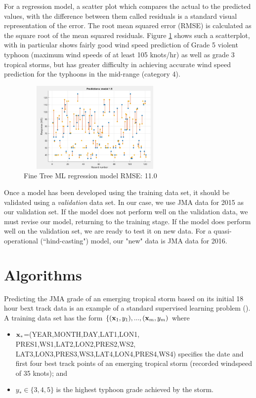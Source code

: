 \documentclass{SBCbookchapter}
\begin{document}
  
For a regression model, a scatter plot which compares the actual to the predicted values, with the difference between them called residuals is a standard visual representation of the error. The root mean squared error (RMSE) is calculated as the square root of the mean squared residuals. Figure \ref{FineTreeRegression} shows such a scatterplot, with in particular shows fairly good wind speed prediction of Grade 5 violent typhoon (maximum wind speeds of at least 105 knots/hr) as well as grade 3 tropical storms, but has greater difficulty in achieving accurate wind speed prediction for the typhoons in the mid-range (category 4).

\begin{figure}[!htpb]
	\centering
	\includegraphics[width=3in,height=1.75in]{TyphoonCM2.png}
	\caption{Fine Tree ML regression model RMSE: 11.0 }
	\label{FineTreeRegression}
\end{figure}



Once a model has been developed using the training data set, it should be validated using a \emph{validation} data set. In our case, we use JMA data for 2015  as our validation set.  If the model does not perform well on the validation data, we must revise our model, returning to the training stage.  If the model does perform well on the validation set, we are ready to test it on new data. For a quasi-operational (``hind-casting") model, our "new" data is JMA data for 2016.

\section{Algorithms}

Predicting the JMA grade of an emerging tropical storm based on its initial 18 hour bext track data is an example of a standard supervised learning problem (\cite{Diet}). A training data set has the form $\{({\bf x}_1,y_1),...,({\bf x}_m,y_m)$  where 
\begin{itemize}
\item ${\bf x_*}$=(YEAR,MONTH,DAY,LAT1,LON1,
PRES1,WS1,LAT2,LON2,PRES2,WS2,\\LAT3,LON3,PRES3,WS3,LAT4,LON4,PRES4,WS4) specifies the date and first four best track points of an emerging tropical storm (recorded windspeed of 35 knots); and 
\item $y_*\in\{3,4,5\}$ is the highest typhoon grade achieved by the storm. 
\end{itemize}
\end{document}
